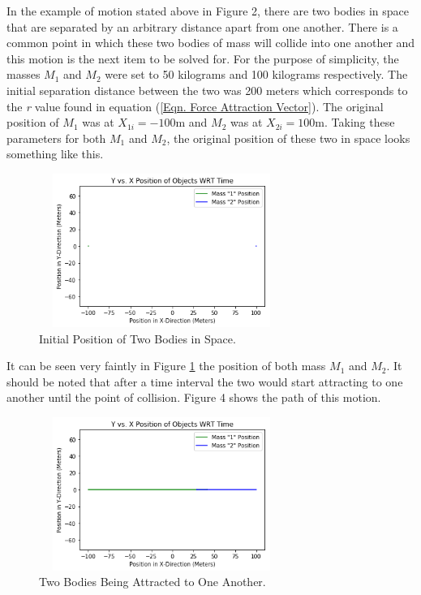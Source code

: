 \documentclass[twocolumn]{article}
\begin{document}
In the example of motion stated above in Figure 2, there are two bodies in space that are separated by an arbitrary distance apart from one another. There is a common point in which these two bodies of mass will collide into one another and this motion is the next item to be solved for. For the purpose of simplicity, the masses $M_1$ and $M_2$ were set to 50 kilograms and 100 kilograms respectively. The initial separation distance between the two was 200 meters which corresponds to the \textit{r} value found in equation (\ref{Eqn. Force Attraction Vector}). The original position of $M_1$ was at $X_{1i}=-100$m and $M_2$ was at $X_{2i}=100$m. Taking these parameters for both $M_1$ and $M_2$, the original position of these two in space looks something like this.
\begin{figure}[ht]
    \centering
    \includegraphics[width=8cm, height=5cm]{Figures/2-Body (1).png}
    \caption{\small{Initial Position of Two Bodies in Space.}}
    \label{Fig. 2-Body Fig. 1}
\end{figure}
\par \noindent
It can be seen very faintly in Figure \ref{Fig. 2-Body Fig. 1} the position of both mass $M_1$ and $M_2$. It should be noted that after a time interval the two would start attracting to one another until the point of collision. Figure 4 shows the path of this motion.
\newpage
\begin{figure}[h]
    \centering
    \includegraphics[width=8cm, height=5cm]{Figures/2-Body (2).png}
    \caption{\small{Two Bodies Being Attracted to One Another.}}
    \label{Fig. 2-Body Fig. 2}
\end{figure}
\end{document}
